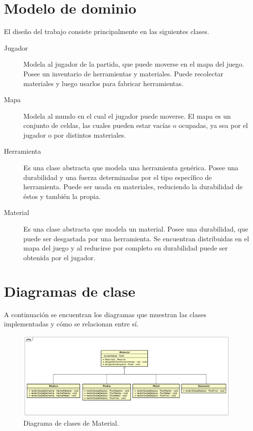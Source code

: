 \documentclass[titlepage,a4paper]{article}
\begin{document}
\section{Modelo de dominio}\label{sec:modelo}
El diseño del trabajo consiste principalmente en las siguientes clases.
\begin{description}
\item[Jugador] Modela al jugador de la partida, que puede moverse en el mapa del juego. Posee un inventario de herramientas y materiales. Puede recolectar materiales y luego usarlos para fabricar herramientas.
\item[Mapa] Modela al mundo en el cual el jugador puede moverse. El mapa es un conjunto de celdas, las cuales pueden estar vacías o ocupadas, ya sea por el jugador o por distintos materiales.
\item[Herramienta] Es una clase abstracta que modela una herramienta genérica. Posee una durabilidad y una fuerza determinadas por el tipo específico de herramienta. Puede ser usada en materiales, reduciendo la durabilidad de éstos y también la propia.
\item[Material] Es una clase abstracta que modela un material. Posee una durabilidad, que puede ser desgastada por una herramienta. Se encuentran distribuidas en el mapa del juego y al reducirse por completo su durabilidad puede ser obtenida por el jugador.
\end{description}

\section{Diagramas de clase}\label{sec:diagramasdeclase}
A continuación se encuentran los diagramas que muestran las clases implementadas y cómo se relacionan entre sí.

\begin{figure}[H]
\centering
\includegraphics[width=\textwidth]{Diagramas/Materiales.png}
\caption{\label{fig:material}Diagrama de clases de Material.}
\end{figure}
\end{document}
